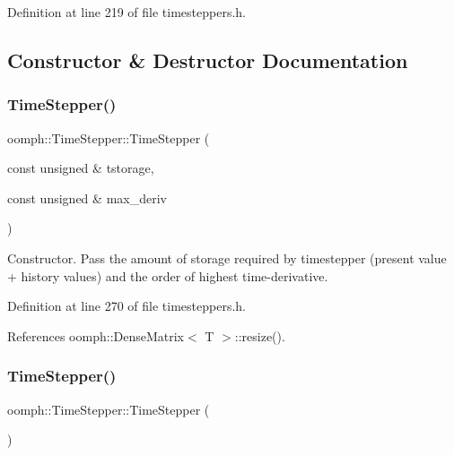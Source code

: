 Definition at line 219 of file timesteppers.\+h.



\subsection{Constructor \& Destructor Documentation}
\mbox{\label{classoomph_1_1TimeStepper_a8a4f14d18d49b82f0a6ad1c279485cd9}} 
\subsubsection{\texorpdfstring{Time\+Stepper()}{TimeStepper()}\hspace{0.1cm}{\footnotesize\ttfamily [1/3]}}
{\footnotesize\ttfamily oomph\+::\+Time\+Stepper\+::\+Time\+Stepper (\begin{DoxyParamCaption}\item[{const unsigned \&}]{tstorage,  }\item[{const unsigned \&}]{max\+\_\+deriv }\end{DoxyParamCaption})\hspace{0.3cm}{\ttfamily [inline]}}



Constructor. Pass the amount of storage required by timestepper (present value + history values) and the order of highest time-\/derivative. 



Definition at line 270 of file timesteppers.\+h.



References oomph\+::\+Dense\+Matrix$<$ T $>$\+::resize().

\mbox{\label{classoomph_1_1TimeStepper_a67f21ad40e01e35dd4cbb218aecbf596}} 
\subsubsection{\texorpdfstring{Time\+Stepper()}{TimeStepper()}\hspace{0.1cm}{\footnotesize\ttfamily [2/3]}}
{\footnotesize\ttfamily oomph\+::\+Time\+Stepper\+::\+Time\+Stepper (\begin{DoxyParamCaption}{ }\end{DoxyParamCaption})\hspace{0.3cm}{\ttfamily [inline]}}



